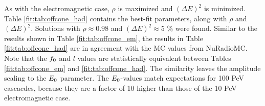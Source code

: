 \documentclass[amsmath,amssymb,aps,prd,10pt,twocolumn]{revtex4}
\begin{document}
As with the electromagnetic case, $\rho$ is maximized and $(\Delta E)^2$ is minimized.  Table \ref{fit:tab:offcone_had} contains the best-fit parameters, along with $\rho$ and $(\Delta E)^2$.  Solutions with $\rho \approx 0.98$ and $(\Delta E)^2 \approx 5$ \% were found.  Similar to the results shown in Table \ref{fit:tab:offcone_em}, the results in Table \ref{fit:tab:offcone_had} are in agreement with the MC values from NuRadioMC.  Note that the $f_{\rm 0}$ and $l$ values are statistically equivalent between Tables \ref{fit:tab:offcone_em} and \ref{fit:tab:offcone_had}.  The similarity leaves the amplitude scaling to the $E_{\rm 0}$ parameter.  The $E_{\rm 0}$-values match expectations for 100 PeV cascacdes, because they are a factor of 10 higher than those of the 10 PeV electromagnetic case.

\begingroup
\squeezetable
\end{document}
